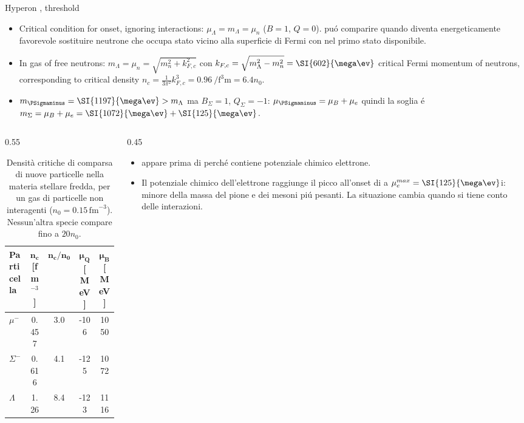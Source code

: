 \begin{frame}{Hyperon \PLambda, \PSigmaminus threshold}
    \begin{itemize}
        \item Critical condition for \PLambda onset, ignoring interactions: $\mu_{\Lambda}=m_{\Lambda}=\mu_n$ ($B=1$, $Q=0$). \PLambda pu\'o comparire quando diventa energeticamente favorevole sostituire neutrone che occupa stato vicino alla superficie di Fermi con \PLambda nel primo stato disponibile.
        \item In gas of free neutrons: $m_{\Lambda}=\mu_n=\sqrt{m_n^2+k_{F,c}^2}$ con $k_{F,c}=\sqrt{m_{\Lambda}^2-m_n^2}=\SI{602}{\mega\ev}$ critical Fermi momentum of neutrons, corresponding to critical density $n_c=\frac{1}{3\pi^2}k_{F,c}^3=\SI{0.96}{\per\cubic\femto\meter}=6.4n_0$.
        \item $m_{\PSigmaminus}=\SI{1197}{\mega\ev}>m_{\Lambda}$ ma $B_{\Sigma}=1$, $Q_{\Sigma}=-1$: $\mu_{\PSigmaminus}=\mu_B+\mu_e$ quindi la soglia \'e $m_{\Sigma}=\mu_B+\mu_e=\SI{1072}{\mega\ev}+\SI{125}{\mega\ev}$.
    \end{itemize}
    \begin{columns}[T]
        \begin{column}{0.55\textwidth}
\begin{table}
\centering
\small
\begin{tabular}{lcccc}
\hline
\textbf{Particella}
& \(\boldsymbol{n_c}\) [fm\(^{-3}\)]
& \(\boldsymbol{n_c/n_0}\)
& \(\boldsymbol{\mu_Q}\) [MeV]
& \(\boldsymbol{\mu_B}\) [MeV]\\
\hline
\(\mu^-\)    & 0.457 & 3.0 & -106 & 1050\\
\(\Sigma^-\) & 0.616 & 4.1 & -125 & 1072\\
\(\Lambda\)  & 1.26  & 8.4 & -123 & 1116\\
\hline
\end{tabular}
\caption{Densità critiche di comparsa di nuove particelle
nella materia stellare fredda, per un gas di particelle
non interagenti (\(n_0=0.15\,\mathrm{fm}^{-3}\)).
Nessun'altra specie compare fino a \(20n_0\).}
\end{table}
        \end{column}
        \begin{column}{0.45\textwidth}
            \begin{itemize}
                \item \PSigmaminus appare prima di \PLambda perch\'e contiene potenziale chimico elettrone.
                \item Il potenziale chimico dell'elettrone raggiunge il picco all'onset di \PSigmaminus a $\mu_e^{max}=\SI{125}{\mega\ev}$i: minore della massa del pione e dei mesoni pi\'u pesanti. La situazione cambia quando si tiene conto delle interazioni.

\end{itemize}
\end{column}
\end{columns}
\end{frame}
